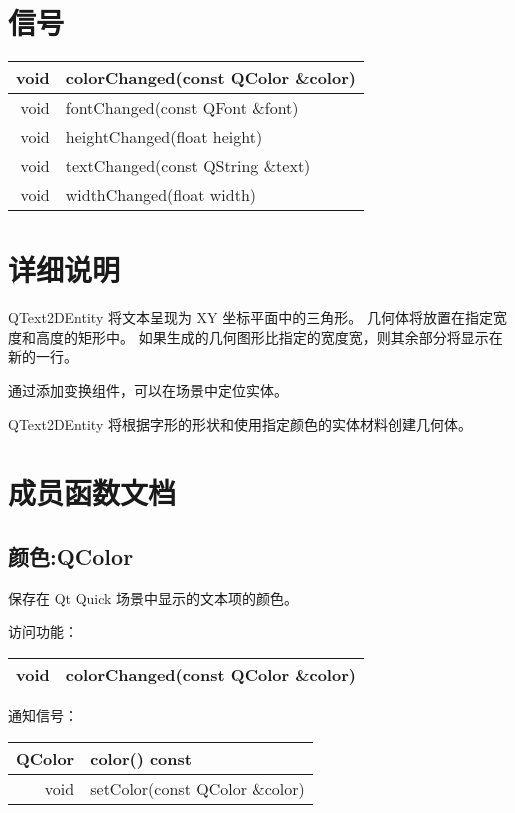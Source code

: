 \section{信号}


\begin{tabular}{|r|l|}
	\hline
	void &	colorChanged(const QColor \&color)\\
	\hline
	void&	fontChanged(const QFont \&font)\\
	\hline
	void	&heightChanged(float height)\\
	\hline
	void&	textChanged(const QString \&text)\\
	\hline
	void	&widthChanged(float width)\\
	\hline
	\end{tabular}

	\section{详细说明}

QText2DEntity 将文本呈现为 XY 坐标平面中的三角形。 
几何体将放置在指定宽度和高度的矩形中。 
如果生成的几何图形比指定的宽度宽，则其余部分将显示在新的一行。
	
通过添加变换组件，可以在场景中定位实体。
	
QText2DEntity 将根据字形的形状和使用指定颜色的实体材料创建几何体。

\section{成员函数文档}

\subsection{颜色:QColor}

保存在 Qt Quick 场景中显示的文本项的颜色。

访问功能：

\begin{tabular}{|r|l|}
\hline
void &	colorChanged(const QColor \&color) \\ 
\hline
\end{tabular}

通知信号：

\begin{tabular}{|r|l|}
\hline
QColor&	color() const \\ 
\hline
void	&setColor(const QColor \&color) \\ 
\hline
\end{tabular}

